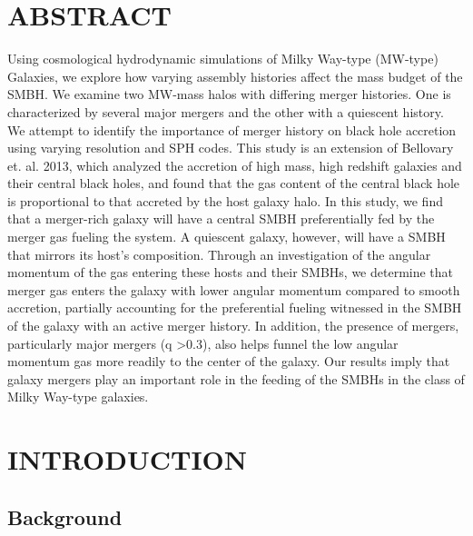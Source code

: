 \documentclass[12pt,headA,chapB]{fiskthesis}
\begin{document}
\newpage
{}
\listoffigures
\thispagestyle{fancy}


\newpage
{}
\chapter*{\normalsize ABSTRACT}
\thispagestyle{empty}
\rhead{\small\thepage}
Using cosmological hydrodynamic simulations of Milky Way-type (MW-type) Galaxies, we explore how varying assembly histories affect the mass budget of the SMBH. We examine two MW-mass halos with differing merger histories. One is characterized by several major mergers and the other with a quiescent history. We attempt to identify the importance of merger history on black hole accretion using varying resolution and SPH codes. This study is an extension of Bellovary et. al. 2013, which analyzed the accretion of high mass, high redshift galaxies and their central black holes, and found that the gas content of the central black hole is proportional to that accreted by the host galaxy halo. In this study, we find that a merger-rich galaxy will have a central SMBH preferentially fed by the merger gas fueling the system. A quiescent galaxy, however, will have a SMBH that mirrors its host's composition. Through an investigation of the angular momentum of the gas entering these hosts and their SMBHs, we determine that merger gas enters the galaxy with lower angular momentum compared to smooth accretion, partially accounting for the preferential fueling witnessed in the SMBH of the galaxy with an active merger history. In addition, the presence of mergers, particularly major mergers (q \textgreater 0.3), also helps funnel the low angular momentum gas more readily to the center of the galaxy. Our results imply that galaxy mergers play an important role in the feeding of the SMBHs in the class of Milky Way-type galaxies.
\vspace{4ex}


\mainmatter
\chapter{\normalsize INTRODUCTION}
\section{\normalsize Background}
\thispagestyle{empty}
\end{document}
